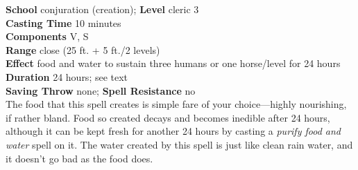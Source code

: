 \textbf{School} conjuration (creation); \textbf{Level} cleric 3\\
\textbf{Casting Time} 10 minutes\\
\textbf{Components} V, S\\
\textbf{Range} close (25 ft. + 5 ft./2 levels)\\
\textbf{Effect} food and water to sustain three humans or one horse/level for 24 hours\\
\textbf{Duration} 24 hours; see text\\
\textbf{Saving Throw} none; \textbf{Spell Resistance} no\\
The food that this spell creates is simple fare of your choice---highly nourishing, if rather bland. Food so created decays and becomes inedible after 24 hours, although it can be kept fresh for another 24 hours by casting a \textit{purify food and water }spell on it. The water created by this spell is just like clean rain water, and it doesn't go bad as the food does.\\
